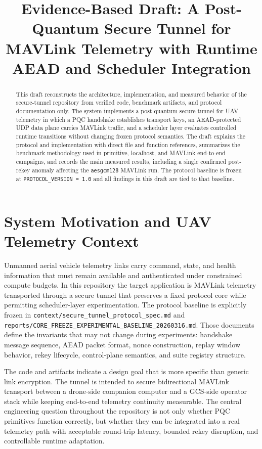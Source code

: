 \documentclass[conference]{IEEEtran}
\title{Evidence-Based Draft: A Post-Quantum Secure Tunnel for MAVLink Telemetry with Runtime AEAD and Scheduler Integration}
\author{\IEEEauthorblockN{First Author}
\IEEEauthorblockA{\textit{Affiliation}\\
City, Country\\
email@domain.com}
\and
\IEEEauthorblockN{Second Author}
\IEEEauthorblockA{\textit{Affiliation}\\
City, Country\\
email@domain.com}}
\begin{document}
\maketitle

\begin{abstract}
This draft reconstructs the architecture, implementation, and measured behavior of the secure-tunnel repository from verified code, benchmark artifacts, and protocol documentation only. The system implements a post-quantum secure tunnel for UAV telemetry in which a PQC handshake establishes transport keys, an AEAD-protected UDP data plane carries MAVLink traffic, and a scheduler layer evaluates controlled runtime transitions without changing frozen protocol semantics. The draft explains the protocol and implementation with direct file and function references, summarizes the benchmark methodology used in primitive, localhost, and MAVLink end-to-end campaigns, and records the main measured results, including a single confirmed post-rekey anomaly affecting the \texttt{aesgcm128} MAVLink run. The protocol baseline is frozen at \texttt{PROTOCOL\_VERSION = 1.0} and all findings in this draft are tied to that baseline.
\end{abstract}

\section{System Motivation and UAV Telemetry Context}
Unmanned aerial vehicle telemetry links carry command, state, and health information that must remain available and authenticated under constrained compute budgets. In this repository the target application is MAVLink telemetry transported through a secure tunnel that preserves a fixed protocol core while permitting scheduler-layer experimentation. The protocol baseline is explicitly frozen in \texttt{context/secure\_tunnel\_protocol\_spec.md} and \texttt{reports/CORE\_FREEZE\_EXPERIMENTAL\_BASELINE\_20260316.md}. Those documents define the invariants that may not change during experiments: handshake message sequence, AEAD packet format, nonce construction, replay window behavior, rekey lifecycle, control-plane semantics, and suite registry structure.

The code and artifacts indicate a design goal that is more specific than generic link encryption. The tunnel is intended to secure bidirectional MAVLink transport between a drone-side companion computer and a GCS-side operator stack while keeping end-to-end telemetry continuity measurable. The central engineering question throughout the repository is not only whether PQC primitives function correctly, but whether they can be integrated into a real telemetry path with acceptable round-trip latency, bounded rekey disruption, and controllable runtime adaptation.
\end{document}
